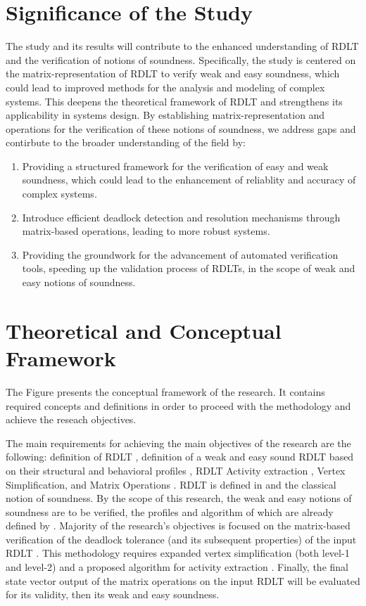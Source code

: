 \section{Significance of the Study}
\indent The study and its results will contribute to the enhanced understanding of RDLT and the verification of notions of soundness. Specifically, the study is centered on the matrix-representation of RDLT to verify weak and easy soundness, which could lead to improved methods for the analysis and modeling of complex systems. This deepens the theoretical framework of RDLT and strengthens its applicability in systems design. By establishing matrix-representation and operations for the verification of these notions of soundness, we address gaps and contirbute to the broader understanding of the field by:
\begin{enumerate}
    \item Providing a structured framework for the verification of easy and weak soundness, which could lead to the enhancement of reliablity and accuracy of complex systems.
    \item Introduce efficient deadlock detection and resolution mechanisms through matrix-based operations, leading to more robust systems.
    \item Providing the groundwork for the advancement of automated verification tools, speeding up the validation process of RDLTs, in the scope of weak and easy notions of soundness.
\end{enumerate}

\section{Theoretical and Conceptual Framework}
\label{sec:TCF}
The Figure presents the conceptual framework of the research. It contains required concepts and definitions in order to proceed with the methodology and achieve the reseach objectives. 

The main requirements for achieving the main objectives of the research are the following: definition of RDLT \cite{Malinao2017}, definition of a weak and easy sound RDLT based on their structural and behavioral profiles \cite{Ramirez2024}, RDLT Activity extraction \cite{Malinao2017} \cite{Asoy2024}, Vertex Simplification, and Matrix Operations \cite{KarenRoben2018}. RDLT is defined in \cite{Malinao2017} and the classical notion of soundness. By the scope of this research, the weak and easy notions of soundness are to be verified, the profiles and algorithm of which are already defined by \cite{Ramirez2024}. Majority of the research's objectives is focused on the matrix-based verification of the deadlock tolerance (and its subsequent properties) of the input RDLT \cite{Ramirez2024}. This methodology requires expanded vertex simplification \cite{MalinaoWCTP2023} (both level-1 and level-2) and a proposed algorithm for activity extraction \cite{Malinao2017}. Finally, the final state vector output of the matrix operations on the input RDLT will be evaluated for its validity, then its weak and easy soundness.


